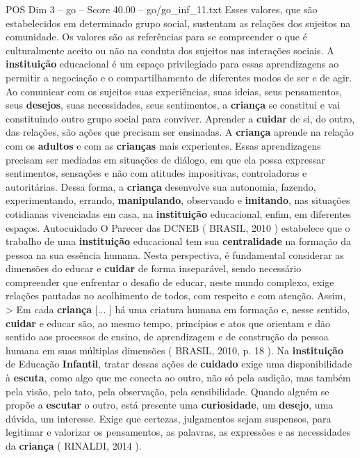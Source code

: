 \begin{textsample}{POS Dim 3 – go – Score 40.00 – go/go\_inf\_11.txt}
Esses valores, que são estabelecidos em determinado grupo social, sustentam as relações dos sujeitos na comunidade.
Os valores são as referências para se compreender o que é culturalmente aceito ou não na conduta dos sujeitos nas interações sociais.
A \textbf{instituição} educacional é um espaço privilegiado para essas aprendizagens ao permitir a negociação e o compartilhamento de diferentes modos de ser e de agir.
Ao comunicar com os sujeitos suas experiências, suas ideias, seus pensamentos, seus \textbf{desejos}, suas necessidades, seus sentimentos, a \textbf{criança} se constitui e vai constituindo outro grupo social para conviver.
Aprender a \textbf{cuidar} de si, do outro, das relações, são ações que precisam ser ensinadas.
A \textbf{criança} aprende na relação com os \textbf{adultos} e com as \textbf{crianças} mais experientes.
Essas aprendizagens precisam ser mediadas em situações de diálogo, em que ela possa expressar sentimentos, sensações e não com atitudes impositivas, controladoras e autoritárias.
Dessa forma, a \textbf{criança} desenvolve sua autonomia, fazendo, experimentando, errando, \textbf{manipulando}, observando e \textbf{imitando}, nas situações cotidianas vivenciadas em casa, na \textbf{instituição} educacional, enfim, em diferentes espaços.
Autocuidado O Parecer das DCNEB ( BRASIL, 2010 ) estabelece que o trabalho de uma \textbf{instituição} educacional tem sua \textbf{centralidade} na formação da pessoa na sua essência humana.
Nesta perspectiva, é fundamental considerar as dimensões do educar e \textbf{cuidar} de forma inseparável, sendo necessário compreender que enfrentar o desafio de educar, neste mundo complexo, exige relações pautadas no acolhimento de todos, com respeito e com atenção.
Assim, > Em cada \textbf{criança} [... ] há uma criatura humana em formação e, nesse sentido, \textbf{cuidar} e educar são, ao mesmo tempo, princípios e atos que orientam e dão sentido aos processos de ensino, de aprendizagem e de construção da pessoa humana em suas múltiplas dimensões ( BRASIL, 2010, p. 18 ).
Na \textbf{instituição} de Educação \textbf{Infantil}, tratar dessas ações de \textbf{cuidado} exige uma disponibilidade à \textbf{escuta}, como algo que me conecta ao outro, não só pela audição, mas também pela visão, pelo tato, pela observação, pela sensibilidade.
Quando alguém se propõe a \textbf{escutar} o outro, está presente uma \textbf{curiosidade}, um \textbf{desejo}, uma dúvida, um interesse.
Exige que certezas, julgamentos sejam suspensos, para legitimar e valorizar os pensamentos, as palavras, as expressões e as necessidades da \textbf{criança} ( RINALDI, 2014 ).

\end{textsample}
